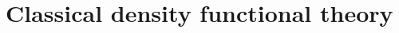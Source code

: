 \documentclass{beamer}
\begin{document}



\section*{Classical density functional theory}
\end{document}
